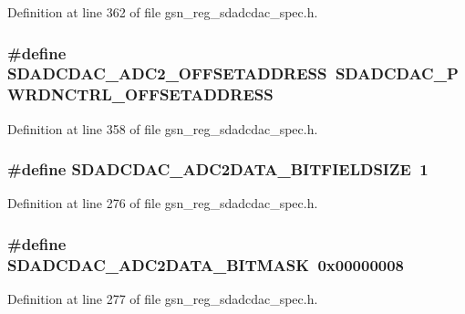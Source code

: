 Definition at line 362 of file gsn\_\-reg\_\-sdadcdac\_\-spec.h.

\hypertarget{a00569_aee7168e53a21f6f6b6648b3496e8d2f5}{
\subsubsection[{SDADCDAC\_\-ADC2\_\-OFFSETADDRESS}]{\setlength{\rightskip}{0pt plus 5cm}\#define SDADCDAC\_\-ADC2\_\-OFFSETADDRESS~SDADCDAC\_\-PWRDNCTRL\_\-OFFSETADDRESS}}
\label{a00569_aee7168e53a21f6f6b6648b3496e8d2f5}


Definition at line 358 of file gsn\_\-reg\_\-sdadcdac\_\-spec.h.

\hypertarget{a00569_aad45e46c76bcfe75f7e878228c30dbbb}{
\subsubsection[{SDADCDAC\_\-ADC2DATA\_\-BITFIELDSIZE}]{\setlength{\rightskip}{0pt plus 5cm}\#define SDADCDAC\_\-ADC2DATA\_\-BITFIELDSIZE~1}}
\label{a00569_aad45e46c76bcfe75f7e878228c30dbbb}


Definition at line 276 of file gsn\_\-reg\_\-sdadcdac\_\-spec.h.

\hypertarget{a00569_a8f0366c01e089c6281a66cbfcfcb833d}{
\subsubsection[{SDADCDAC\_\-ADC2DATA\_\-BITMASK}]{\setlength{\rightskip}{0pt plus 5cm}\#define SDADCDAC\_\-ADC2DATA\_\-BITMASK~0x00000008}}
\label{a00569_a8f0366c01e089c6281a66cbfcfcb833d}


Definition at line 277 of file gsn\_\-reg\_\-sdadcdac\_\-spec.h.

